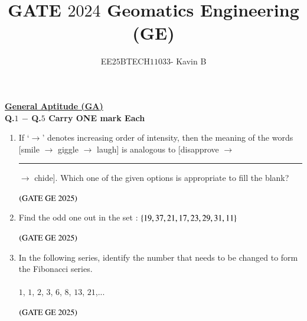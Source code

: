 \documentclass[journal,12pt,onecolumn]{IEEEtran}
\theoremstyle{remark}
\begin{document}
\title{GATE $2024$ Geomatics Engineering (GE)}
\author{EE$25$BTECH$11033$- Kavin B}
\maketitle
\renewcommand{\thefigure}{\theenumi}
\renewcommand{\thetable}{\theenumi}

\underline{\textbf{General Aptitude (GA)}}
\\


\textbf{Q.$1$ $-$ Q.$5$ Carry ONE mark Each}
\vspace{0.5cm}
\begin{enumerate}
\item If `$\rightarrow$' denotes increasing order of intensity, then the meaning of the words [smile $\rightarrow$ giggle $\rightarrow$ laugh] is analogous to [disapprove $\rightarrow$ \rule{2.5cm}{1pt}$\rightarrow$ chide].
Which one of the given options is appropriate to fill the blank?
\begin{enumerate}
\end{enumerate}
\hfill $\left(\text{GATE GE 2025}\right)$
\bigskip
\item Find the odd one out in the set : $\left\{19,37,21,17, 23, 29, 31, 11\right\}$
\begin{enumerate}
\end{enumerate}
\hfill $\left(\text{GATE GE 2025}\right)$
\bigskip
\item In the following series, identify the number that needs to be changed to form the Fibonacci series.\\
\\
$1$, $1$, $2$, $3$, $6$, $8$, $13$, $21$,...
\begin{enumerate}
\end{enumerate}
\hfill $\left(\text{GATE GE 2025}\right)$
\bigskip


\end{enumerate}
\end{document}
